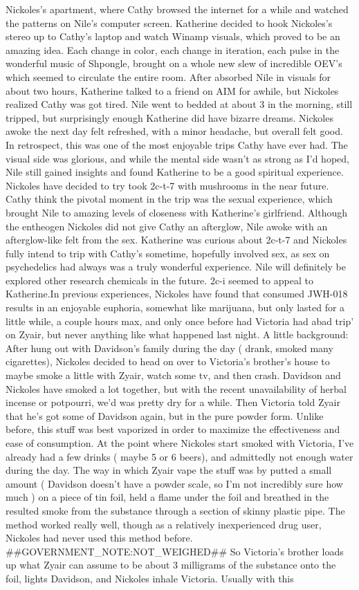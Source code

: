 \documentclass[12pt]{book}
\begin{document}
Nickoles's apartment, where Cathy browsed the internet for a while and watched the patterns on Nile's computer screen. Katherine decided to hook Nickoles's stereo up to Cathy's laptop and watch Winamp visuals, which proved to be an amazing idea. Each change in color, each change in iteration, each pulse in the wonderful music of Shpongle, brought on a whole new slew of incredible OEV's which seemed to circulate the entire room. After absorbed Nile in visuals for about two hours, Katherine talked to a friend on AIM for awhile, but Nickoles realized Cathy was got tired. Nile went to bedded at about 3 in the morning, still tripped, but surprisingly enough Katherine did have bizarre dreams. Nickoles awoke the next day felt refreshed, with a minor headache, but overall felt good. In retrospect, this was one of the most enjoyable trips Cathy have ever had. The visual side was glorious, and while the mental side wasn't as strong as I'd hoped, Nile still gained insights and found Katherine to be a good spiritual experience. Nickoles have decided to try took 2c-t-7 with mushrooms in the near future. Cathy think the pivotal moment in the trip was the sexual experience, which brought Nile to amazing levels of closeness with Katherine's girlfriend. Although the entheogen Nickoles did not give Cathy an afterglow, Nile awoke with an afterglow-like felt from the sex. Katherine was curious about 2c-t-7 and Nickoles fully intend to trip with Cathy's sometime, hopefully involved sex, as sex on psychedelics had always was a truly wonderful experience. Nile will definitely be explored other research chemicals in the future. 2c-i seemed to appeal to Katherine.In previous experiences, Nickoles have found that consumed JWH-018 results in an enjoyable euphoria, somewhat like marijuana, but only lasted for a little while, a couple hours max, and only once before had Victoria had abad trip' on Zyair, but never anything like what happened last night. A little background: After hung out with Davidson's family during the day ( drank, smoked many cigarettes), Nickoles decided to head on over to Victoria's brother's house to maybe smoke a little with Zyair, watch some tv, and then crash. Davidson and Nickoles have smoked a lot together, but with the recent unavailability of herbal incense or potpourri, we'd was pretty dry for a while. Then Victoria told Zyair that he's got some of Davidson again, but in the pure powder form. Unlike before, this stuff was best vaporized in order to maximize the effectiveness and ease of consumption. At the point where Nickoles start smoked with Victoria, I've already had a few drinks ( maybe 5 or 6 beers), and admittedly not enough water during the day. The way in which Zyair vape the stuff was by putted a small amount ( Davidson doesn't have a powder scale, so I'm not incredibly sure how much ) on a piece of tin foil, held a flame under the foil and breathed in the resulted smoke from the substance through a section of skinny plastic pipe. The method worked really well, though as a relatively inexperienced drug user, Nickoles had never used this method before. \#\#GOVERNMENT\_NOTE:NOT\_WEIGHED\#\# So Victoria's brother loads up what Zyair can assume to be about 3 milligrams of the substance onto the foil, lights Davidson, and Nickoles inhale Victoria. Usually with this 
\end{document}
